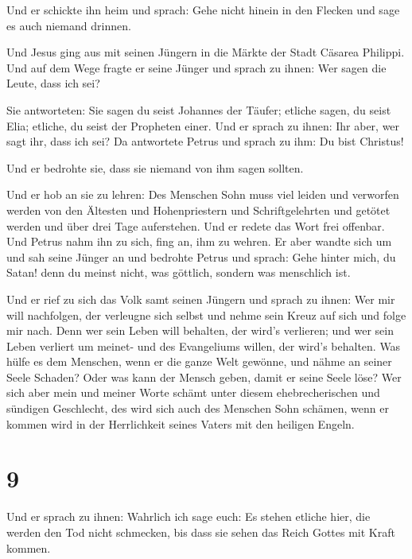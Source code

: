  Und er schickte ihn heim und sprach: Gehe nicht hinein
in den Flecken und sage es auch niemand drinnen.

 Und Jesus ging aus mit seinen Jüngern in die Märkte der
Stadt Cäsarea Philippi. Und auf dem Wege fragte er seine Jünger und
sprach zu ihnen: Wer sagen die Leute, dass ich sei?

 Sie antworteten: Sie sagen du seist Johannes der Täufer;
etliche sagen, du seist Elia; etliche, du seist der Propheten einer.
 Und er sprach zu ihnen: Ihr aber, wer sagt ihr, dass ich
sei? Da antwortete Petrus und sprach zu ihm: Du bist Christus!

 Und er bedrohte sie, dass sie niemand von ihm sagen
sollten.

 Und er hob an sie zu lehren: Des Menschen Sohn muss viel
leiden und verworfen werden von den Ältesten und Hohenpriestern und
Schriftgelehrten und getötet werden und über drei Tage auferstehen.
 Und er redete das Wort frei offenbar. Und Petrus nahm
ihn zu sich, fing an, ihm zu wehren.  Er aber wandte sich
um und sah seine Jünger an und bedrohte Petrus und sprach: Gehe hinter
mich, du Satan! denn du meinst nicht, was göttlich, sondern was
menschlich ist.

 Und er rief zu sich das Volk samt seinen Jüngern und
sprach zu ihnen: Wer mir will nachfolgen, der verleugne sich selbst und
nehme sein Kreuz auf sich und folge mir nach.  Denn wer
sein Leben will behalten, der wird's verlieren; und wer sein Leben
verliert um meinet- und des Evangeliums willen, der wird's behalten.
 Was hülfe es dem Menschen, wenn er die ganze Welt
gewönne, und nähme an seiner Seele Schaden?  Oder was
kann der Mensch geben, damit er seine Seele löse?  Wer
sich aber mein und meiner Worte schämt unter diesem ehebrecherischen und
sündigen Geschlecht, des wird sich auch des Menschen Sohn schämen, wenn
er kommen wird in der Herrlichkeit seines Vaters mit den heiligen
Engeln.

\hypertarget{section-8}{%
\section{9}\label{section-8}}

 Und er sprach zu ihnen: Wahrlich ich sage euch: Es stehen
etliche hier, die werden den Tod nicht schmecken, bis dass sie sehen das
Reich Gottes mit Kraft kommen.

